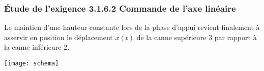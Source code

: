\begin{multicols}{2}
%  
%
%  
%  
%
%

\fi



\subsubsection*{Étude de l'exigence 3.1.6.2 \og Commande de l'axe linéaire\fg{}}
\ifprof
\else
 Le maintien d'une hauteur constante lors de la phase d'appui revient finalement à asservir en position le déplacement $x(t)$ de la canne supérieure 3 par rapport à la canne inférieure 2.

\begin{center}
\texttt{[image: schema]}
\end{center}



\end{multicols}
